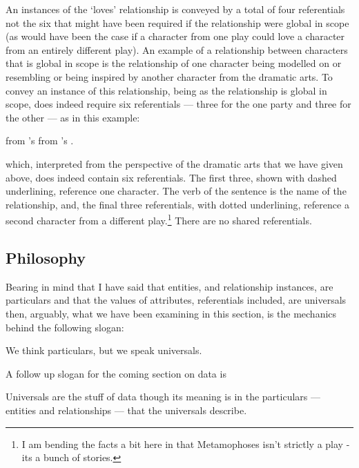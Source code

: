 An instances of the `loves' relationship is conveyed by a total of four referentials
 not the six that might have been required
if the relationship were global in scope (as would have been the case if a
 character from one play could love  a character from an entirely different play).
 An example of a relationship between characters that is global in scope 
 is the relationship of one character being modelled on or resembling or being inspired 
 by another character from the dramatic arts.
 To convey an instance of this relationship, being as the relationship is global in scope,  does indeed require
 six referentials --- three for the one party and three for the other --- as in this example:
\begin{erquote}
\parbox{9.0cm}{\linespread{1.3}\normalsize
{} from 's 
            from 's .}
\end{erquote}
which, interpreted from the perspective of the dramatic arts that we have given above, does indeed contain six referentials. 
The first three, shown with dashed underlining, reference one character.
The verb of the sentence is the name of the relationship, and, 
the final three referentials, with dotted underlining, 
reference a second character from a different play.\footnote{I am bending the facts a bit here 
in that Metamophoses isn't strictly a play - its a bunch of stories.} 
There are no shared referentials.


\subsection{Philosophy}
\mynote
Bearing in mind that I have said that entities, and relationship instances, are particulars
and that the values of attributes, referentials included, are universals then, arguably,
 what we have been examining in this section, 
 is the mechanics behind the following slogan:
\begin{erquote}
We think particulars, but we speak universals.
\end{erquote}
\begin{noteforfuture}
\mynote
A follow up slogan for the coming section on data is
\begin{erquote}
Universals are the stuff of data though its meaning is in the 
particulars --- entities and relationships --- that the universals describe. 
\end{erquote}
\end{noteforfuture}





 
